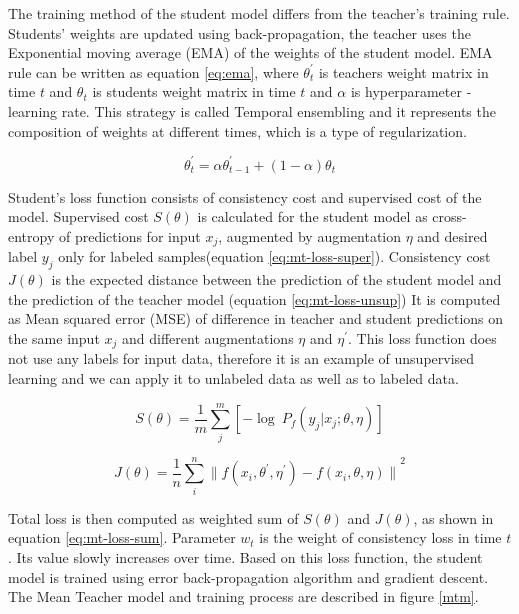 The training method of the student model differs from the teacher's training rule. Students' weights are updated using back-propagation, the teacher uses the Exponential moving average (EMA) of the weights of the student model. EMA rule can be written as equation \ref{eq:ema}, where 
$\theta^\prime_t$ is teachers weight matrix in time $t$ and $\theta_{t}$ is students weight matrix in time $t$ and $\alpha$ is hyperparameter - learning rate. This strategy is called Temporal ensembling \cite{laine2016} and it represents the composition of weights at different times, which is a type of regularization.

\begin{equation}
    \theta_t^\prime = \alpha\theta^\prime_{t-1} + (1-\alpha)\theta_t
    \label{eq:ema}
\end{equation} 


Student's loss function consists of consistency cost and supervised cost of the model. 
Supervised cost $S(\theta)$ is calculated for the student model as cross-entropy of predictions for input $x_j$, augmented by augmentation $\eta$ and desired label $y_j$ only for labeled samples(equation \ref{eq:mt-loss-super}). Consistency cost  $J(\theta)$ is the expected distance between the prediction of the student model and the prediction of the teacher model (equation \ref{eq:mt-loss-unsup})  It is computed as Mean squared error (MSE) of difference in teacher and student predictions on the same input $x_j$ and different augmentations $\eta$ and $\eta^\prime$. This loss function does not use any labels for input data, therefore it is an example of unsupervised learning and we can apply it to unlabeled data as well as to labeled data. 

\begin{equation}
	S(\theta) = \frac{1}{m} \sum_j^m \left[ -\log~P_f(y_j | x_j; \theta,\eta) \right]
	\label{eq:mt-loss-super}
\end{equation} 

\begin{equation}
	J(\theta) = \frac{1}{n} \sum_i^n {\| f(x_i,\theta^{\prime},\eta^{\prime}) - f(x_i,\theta,\eta) \|}^2
	\label{eq:mt-loss-unsup}
\end{equation} 

\noindent Total loss is then computed as weighted sum of $S(\theta)$ and $J(\theta)$, as shown in equation \ref{eq:mt-loss-sum}. Parameter $w_t$ is the weight of consistency loss in time $t$. Its value slowly increases over time. Based on this loss function, the student model is trained using error back-propagation algorithm and gradient descent.
The Mean Teacher model and training process are described in figure \ref{mtm}.

